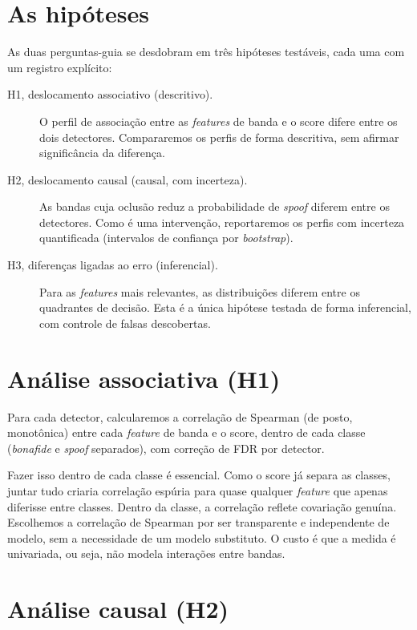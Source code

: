 \documentclass[11pt,a4paper]{article}
\begin{document}
\section{As hipóteses}

As duas perguntas-guia se desdobram em três hipóteses testáveis, cada uma com um
registro explícito:

\begin{description}
  \item[H1, deslocamento associativo (descritivo).] O perfil de associação entre
        as \emph{features} de banda e o score difere entre os dois detectores.
        Compararemos os perfis de forma descritiva, sem afirmar significância da
        diferença.
  \item[H2, deslocamento causal (causal, com incerteza).] As bandas cuja oclusão
        reduz a probabilidade de \emph{spoof} diferem entre os detectores. Como é
        uma intervenção, reportaremos os perfis com incerteza quantificada
        (intervalos de confiança por \emph{bootstrap}).
  \item[H3, diferenças ligadas ao erro (inferencial).] Para as \emph{features}
        mais relevantes, as distribuições diferem entre os quadrantes de decisão.
        Esta é a única hipótese testada de forma inferencial, com controle de
        falsas descobertas.
\end{description}

\section{Análise associativa (H1)}

Para cada detector, calcularemos a correlação de Spearman (de posto, monotônica)
entre cada \emph{feature} de banda e o score, dentro de cada classe
(\emph{bonafide} e \emph{spoof} separados), com correção de FDR por detector.

Fazer isso dentro de cada classe é essencial. Como o score já separa as classes,
juntar tudo criaria correlação espúria para quase qualquer \emph{feature} que
apenas diferisse entre classes. Dentro da classe, a correlação reflete covariação
genuína. Escolhemos a correlação de Spearman por ser transparente e independente
de modelo, sem a necessidade de um modelo substituto. O custo é que a medida é
univariada, ou seja, não modela interações entre bandas.

\section{Análise causal (H2)}
\end{document}

